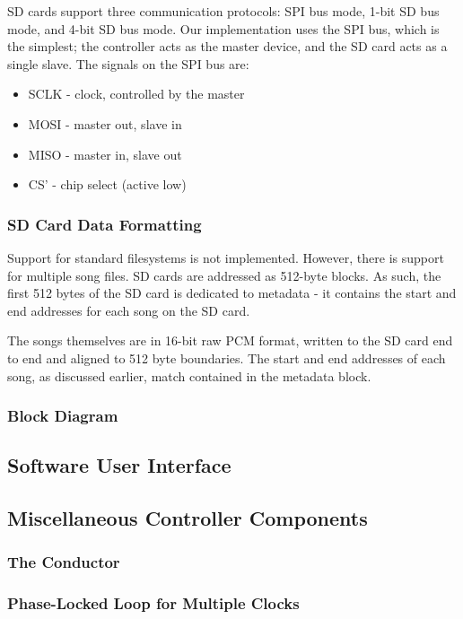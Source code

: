 \documentclass{article}
\begin{document}
SD cards support three communication protocols: SPI bus mode, 1-bit SD bus
mode, and 4-bit SD bus mode. Our implementation uses the SPI bus, which is the
simplest; the controller acts as the master device, and the SD card acts as a
single slave.  The signals on the SPI bus are:
\begin{itemize}
	\item SCLK - clock, controlled by the master
	\item MOSI - master out, slave in
	\item MISO - master in, slave out
	\item CS' - chip select (active low)
\end{itemize}

\subsubsection{SD Card Data Formatting}

Support for standard filesystems is not implemented. However, there is support
for multiple song files. SD cards are addressed as 512-byte blocks. As such,
the first 512 bytes of the SD card is dedicated to metadata - it contains the
start and end addresses for each song on the SD card.

The songs themselves are in 16-bit raw PCM format, written to the SD card end
to end and aligned to 512 byte boundaries. The start and end addresses of each
song, as discussed earlier, match contained in the metadata block.

\subsubsection{Block Diagram}



\subsection{Software User Interface}

\subsection{Miscellaneous Controller Components}
\subsubsection{The Conductor}
\subsubsection{Phase-Locked Loop for Multiple Clocks}
\end{document}
